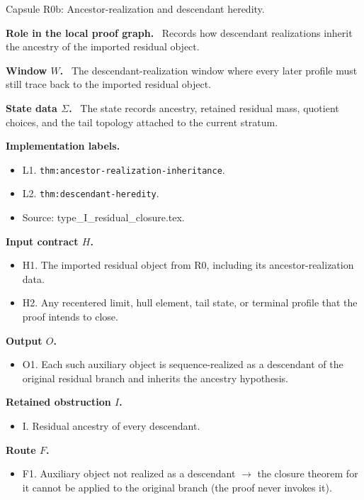 \documentclass[11pt]{amsart}
\newcommand{\capsulefield}[1]{\par\smallskip\noindent\textbf{#1.}\ }
\begin{document}
\begin{proofcapsule}{Capsule R0b: Ancestor-realization and descendant heredity.}
  \capsulefield{Role in the local proof graph}
  Records how descendant realizations inherit the ancestry of the imported residual object.

  \capsulefield{Window \(W\)}
The descendant-realization window where every later profile must still trace back to the imported residual object.

  \capsulefield{State data \(\Sigma\)}
The state records ancestry, retained residual mass, quotient choices, and the tail topology attached to the current stratum.

  \capsulefield{Implementation labels}
  \begin{itemize}[leftmargin=1.8em]
  \item L1. \texttt{thm:ancestor-realization-inheritance}.
  \item L2. \texttt{thm:descendant-heredity}.
  \item Source: type\_I\_residual\_closure.tex.
  \end{itemize}

  \capsulefield{Input contract \(H\)}
  \begin{itemize}[leftmargin=1.8em]
  \item H1. The imported residual object from R0, including its ancestor-realization data.
  \item H2. Any recentered limit, hull element, tail state, or terminal profile that the proof intends to close.
  \end{itemize}

  \capsulefield{Output \(O\)}
  \begin{itemize}[leftmargin=1.8em]
  \item O1. Each such auxiliary object is sequence-realized as a descendant of the original residual branch and inherits the ancestry hypothesis.
  \end{itemize}

  \capsulefield{Retained obstruction \(I\)}
  \begin{itemize}[leftmargin=1.8em]
  \item I. Residual ancestry of every descendant.
  \end{itemize}

  \capsulefield{Route \(F\)}
  \begin{itemize}[leftmargin=1.8em]
  \item F1. Auxiliary object not realized as a descendant $\to$ the closure theorem for it cannot be applied to the original branch (the proof never invokes it).
  \end{itemize}


\end{proofcapsule}
\end{document}
